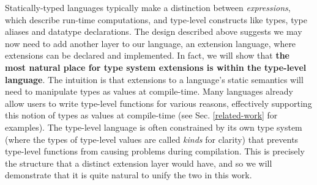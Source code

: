 \documentclass{llncs}
\begin{document}
Statically-typed languages typically make a distinction between \emph{expressions}, which describe run-time computations, and type-level constructs like types, type aliases and datatype declarations. The design described above suggests we may now need to add another layer to our language, an {extension language}, where extensions can be declared and implemented. In fact, we will show that \textbf{the most natural place for type system extensions is within the type-level language}. The intuition is that extensions to a language's static semantics will need to manipulate types as values at compile-time. Many languages already allow users to write type-level functions for various reasons, effectively supporting this notion of types as values at compile-time (see Sec. \ref{related-work} for examples). The type-level language is often constrained by its own type system (where the types of type-level values are called \emph{kinds} for clarity) that prevents type-level functions from causing problems during compilation. This is precisely the structure that a distinct extension layer would have, and so we will demonstrate that it is quite natural to unify the two in this work.
\end{document}
